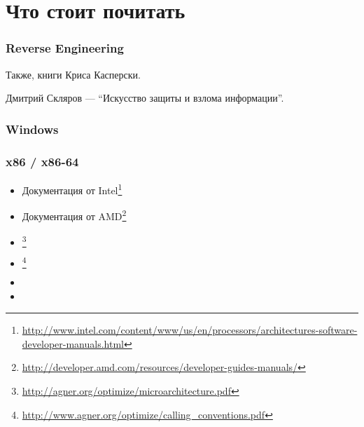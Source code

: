 \chapter{Что стоит почитать}


\subsection{Reverse Engineering}

Также, книги Криса Касперски.

Дмитрий Скляров --- ``Искусство защиты и взлома информации''.



\subsection{Windows}



\subsection{\CCpp}



\subsection{x86 / x86-64}

\label{x86_manuals}
\begin{itemize}
\item Документация от Intel\footnote{\AlsoAvailableAs \url{http://www.intel.com/content/www/us/en/processors/architectures-software-developer-manuals.html}}

\item Документация от AMD\footnote{\AlsoAvailableAs \url{http://developer.amd.com/resources/developer-guides-manuals/}}

\item \AgnerFog{}\footnote{\AlsoAvailableAs \url{http://agner.org/optimize/microarchitecture.pdf}}

\item \AgnerFogCC{}\footnote{\AlsoAvailableAs \url{http://www.agner.org/optimize/calling_conventions.pdf}}

\item \IntelOptimization

\item \AMDOptimization
\end{itemize}

